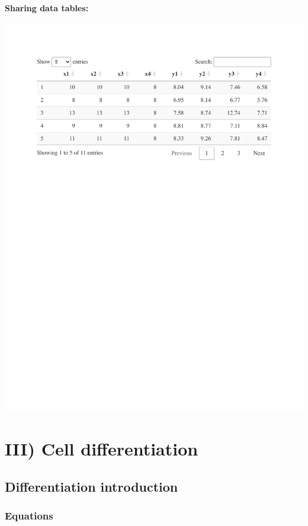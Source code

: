 \documentclass[
  letterpaper,
  DIV=11,
  numbers=noendperiod]{scrreprt}
\theoremstyle{definition}
\theoremstyle{remark}
\begin{document}
\subsection{Sharing data tables:}\label{sharing-data-tables-7}

\includegraphics{morpho_practical_2_files/figure-pdf/tab-anscombe-1.pdf}

\part{III) Cell differentiation}

\chapter{Differentiation
introduction}\label{differentiation-introduction}

\section{Equations}\label{equations-8}
\end{document}
